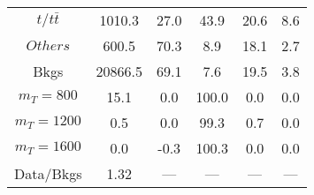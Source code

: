 \begin{figure}
\begin{minipage}[c]{0.32\textwidth}
{\begin{tabular}{cccccc}
$ t/t\bar{t} $ &  1010.3 &  27.0 &  43.9 &  20.6 &  8.6\\
$ Others $ &  600.5 &  70.3 &  8.9 &  18.1 &  2.7\\
Bkgs &  20866.5 &  69.1 &  7.6 &  19.5 &  3.8\\
$ m_{T} = 800 $ &  15.1 &  0.0 &  100.0 &  0.0 &  0.0\\
$ m_{T} = 1200 $ &  0.5 &  0.0 &  99.3 &  0.7 &  0.0\\
$ m_{T} = 1600 $ &  0.0 &  -0.3 &  100.3 &  0.0 &  0.0\\
Data/Bkgs &  1.32 &  --- &  --- &  --- &  ---\\
\hline
\end{tabular}
}
\end{minipage}
\end{figure}

